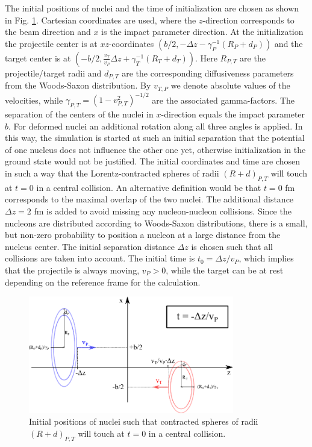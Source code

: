The initial positions of nuclei and the time of initialization are chosen as
shown in Fig. \ref{fig:init_coord_time}.  Cartesian coordinates are used, where the
$z$-direction corresponds to the beam direction and $x$ is the impact parameter
direction. At the initialization the projectile center is at $xz$-coordinates
$(b/2, - \Delta z- \gamma_P^{-1} (R_P + d_P))$ and the target center is at
$(-b/2, \frac{v_T}{v_P}\Delta z + \gamma_T^{-1} (R_T + d_T))$. Here $R_{P,T}$
are the projectile/target radii and $d_{P,T}$ are the corresponding
diffusiveness parameters from the Woods-Saxon distribution. By $v_{T,P}$ we
denote absolute values of the velocities, while  $\gamma_{P,T} = (1 -
v_{P,T}^2)^{-1/2}$ are the associated gamma-factors. The separation of the
centers of the nuclei in $x$-direction equals the impact parameter $b$. For
deformed nuclei an additional rotation along all three angles is applied. In
this way, the simulation is started at such an initial separation that the
potential of one nucleus does not influence the other one yet, otherwise
initialization in the ground state would not be justified.  The initial
coordinates and time are chosen in such a way that the Lorentz-contracted spheres
of radii $(R + d)_{P,T}$ will touch at $t = 0$ in a central collision. An
alternative definition would be that $t=0$ fm corresponds to the maximal
overlap of the two nuclei. The additional distance $\Delta z= 2$ fm is added to
avoid missing any nucleon-nucleon collisions. Since the nucleons are
distributed according to Woods-Saxon distributions, there is a small, but
non-zero probability to position a nucleon at a large distance from the nucleus
center. The initial separation distance $\Delta z$ is chosen such that all
collisions are taken into account. The initial time is $t_0 = \Delta z/v_P$,
which implies that the projectile is always moving, $v_P > 0$, while the target
can be at rest depending on the reference frame for the calculation.

\begin{figure}
  \centering
  \includegraphics[width=0.8\textwidth]{plots/smash/AAcollision_SMASHt0convention.pdf}
  \caption{Initial positions of nuclei such that contracted spheres of radii
           $(R + d)_{P,T}$ will touch at $t = 0$ in a central collision.}
  \label{fig:init_coord_time}
\end{figure}

